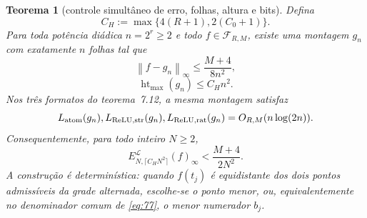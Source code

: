 \documentclass[11pt,a4paper]{article}
\theoremstyle{preciso}
\newtheorem{teorema}{Teorema}[section]
\theoremstyle{definition}
\newcommand{\LL}{\mathcal L}
\newcommand{\FF}{\mathcal F}
\newcommand{\heightq}{\operatorname{ht}}
\newcommand{\norm}[1]{\left\|#1\right\|_{\infty}}
\newcommand{\eqn}[2]{\begin{equation}\label{eq:#1}#2\end{equation}}
\begin{document}
\begin{teorema}[controle simultâneo de erro, folhas, altura e bits]
Defina
\eqn{71}{C_H:=\max\{4(R+1),2(C_0+1)\}.}
Para toda potência diádica $n=2^r\ge2$ e todo $f\in\FF_{R,M}$, existe uma montagem $g_n$ com exatamente $n$ folhas tal que
\eqn{72}{\norm{f-g_n}\le\frac{M+4}{8n^2},}
\eqn{73}{\heightq_{\max}(g_n)\le C_Hn^2.}
Nos três formatos do teorema~7.12, a mesma montagem satisfaz
\eqn{74}{L_{\rm atom}(g_n),L_{\rm ReLU,str}(g_n),L_{\rm ReLU,rat}(g_n)
=O_{R,M}(n\log(2n)).}
Consequentemente, para todo inteiro $N\ge2$,
\eqn{75}{E^{\LL}_{N,\lceil C_HN^2\rceil}(f)_\infty<\frac{M+4}{2N^2}.}
A construção é determinística: quando $f(t_j)$ é equidistante dos dois pontos admissíveis da grade alternada, escolhe-se o ponto menor, ou, equivalentemente no denominador comum de \eqref{eq:77}, o menor numerador $b_j$.
\end{teorema}
\end{document}

